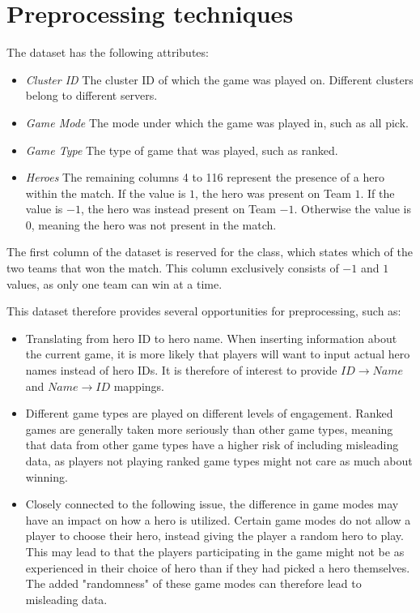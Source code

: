 \documentclass[a4paper, titlepage,12pt]{article}
\begin{document}
	\section{Preprocessing techniques}
		The dataset\cite{dataset} has the following attributes:
		\begin{itemize}
			\item \textit{Cluster ID} The cluster ID of which the game was played on. Different clusters belong to different servers.
			\item \textit{Game Mode} The mode under which the game was played in, such as all pick.
			\item \textit{Game Type} The type of game that was played, such as ranked.
			\item \textit{Heroes} The remaining columns 4 to 116 represent the presence of a hero within the match. If the value is $1$, the hero was present on Team $1$. If the value is $-1$, the hero was instead present on Team $-1$. Otherwise the value is $0$, meaning the hero was not present in the match.
		\end{itemize}
		The first column of the dataset is reserved for the class, which states which of the two teams that won the match. This column exclusively consists of $-1$ and $1$ values, as only one team can win at a time.

		This dataset therefore provides several opportunities for preprocessing, such as:
		\begin{itemize}
			\item Translating from hero ID to hero name. When inserting information about the current game, it is more likely that players will want to input actual hero names instead of hero IDs. It is therefore of interest to provide $ID \rightarrow Name$ and $Name \rightarrow ID$ mappings\cite{mappings}.
				\item Different game types are played on different levels of engagement. Ranked games are generally taken more seriously than other game types, meaning that data from other game types have a higher risk of including misleading data, as players not playing ranked game types might not care as much about winning.
				\item Closely connected to the following issue, the difference in game modes may have an impact on how a hero is utilized. Certain game modes do not allow a player to choose their hero, instead giving the player a random hero to play. This may lead to that the players participating in the game might not be as experienced in their choice of hero than if they had picked a hero themselves. The added "randomness" of these game modes can therefore lead to misleading data.
		\end{itemize}
\end{document}
